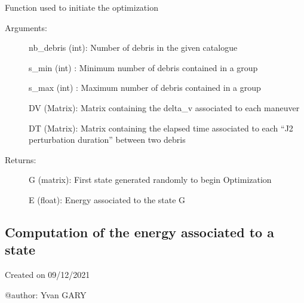 \documentclass[letterpaper,10pt,english]{sphinxmanual}
\begin{document}
\begin{fulllineitems}
\label{\detokenize{regroupement/optimizer:regroupement.optimizer.Init_alea_G.Init_alea_G}}
Function used to initiate the optimization
\begin{description}
\item[{Arguments:}] \leavevmode
nb\_debris (int): Number of debris in the given catalogue

s\_min (int) : Minimum number of debris contained in a group

s\_max (int) : Maximum number of debris contained in a group

DV (Matrix): Matrix containing the delta\_v associated to each maneuver

DT (Matrix): Matrix containing the elapsed time associated to each “J2 perturbation duration” between two debris

\item[{Returns:}] \leavevmode
G (matrix): First state generated randomly to begin Optimization

E (float): Energy associated to the state G

\end{description}

\end{fulllineitems}



\subsection{Computation of the energy associated to a state}
\label{\detokenize{regroupement/optimizer:computation-of-the-energy-associated-to-a-state}}\label{\detokenize{regroupement/optimizer:module-regroupement.optimizer.energy_computation}}
Created on 09/12/2021

@author: Yvan GARY
\end{document}
